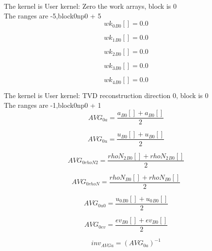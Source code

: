 \documentclass{article}
\begin{document}
\noindent The kernel is User kernel: Zero the work arrays, block is 0\\\noindent The ranges are -5,block0np0 + 5\\\begin{dmath}{wk_{0}{_{B0}}}[{}] = 0.0\end{dmath}

\begin{dmath}{wk_{1}{_{B0}}}[{}] = 0.0\end{dmath}

\begin{dmath}{wk_{2}{_{B0}}}[{}] = 0.0\end{dmath}

\begin{dmath}{wk_{3}{_{B0}}}[{}] = 0.0\end{dmath}

\begin{dmath}{wk_{4}{_{B0}}}[{}] = 0.0\end{dmath}

\noindent The kernel is User kernel: TVD reconstruction direction 0, block is 0\\\noindent The ranges are -1,block0np0 + 1\\\begin{dmath}AVG_{0 a} = \frac{{a{_{B0}}}[{}] + {a{_{B0}}}[{}]}{2}\end{dmath}

\begin{dmath}AVG_{0 u} = \frac{{u{_{B0}}}[{}] + {u{_{B0}}}[{}]}{2}\end{dmath}

\begin{dmath}AVG_{0 rhoN2} = \frac{{rhoN_{2}{_{B0}}}[{}] + {rhoN_{2}{_{B0}}}[{}]}{2}\end{dmath}

\begin{dmath}AVG_{0 rhoN} = \frac{{rhoN{_{B0}}}[{}] + {rhoN{_{B0}}}[{}]}{2}\end{dmath}

\begin{dmath}AVG_{0 u0} = \frac{{u_{0}{_{B0}}}[{}] + {u_{0}{_{B0}}}[{}]}{2}\end{dmath}

\begin{dmath}AVG_{0 ev} = \frac{{ev{_{B0}}}[{}] + {ev{_{B0}}}[{}]}{2}\end{dmath}

\begin{dmath}inv_{AVG a} = \left(AVG_{0 a} \right)^{-1}\end{dmath}
\end{document}
